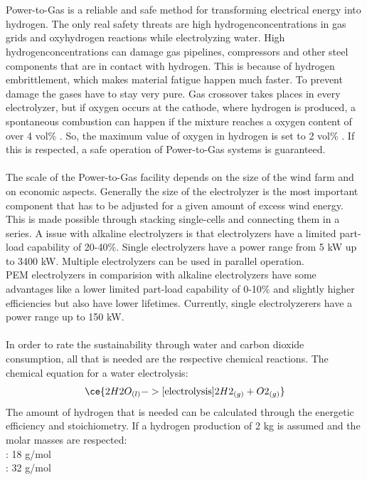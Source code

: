 \begin{parcolumns}[colwidths={1=2.5 cm, 2=10 cm, 3=2.5 cm}]{3}
{\\ \\
Power-to-Gas is a reliable and safe method for transforming electrical energy into hydrogen. The only real safety threats are high hydrogenconcentrations in gas grids and oxyhydrogen reactions while electrolyzing water. High hydrogenconcentrations can damage gas pipelines, compressors and other steel components that are in contact with hydrogen. This is because of hydrogen embrittlement, which makes material fatigue happen much faster. To prevent damage the gases have to stay very pure. Gas crossover takes places in every electrolyzer, but if oxygen occurs at the cathode, where hydrogen is produced, a spontaneous combustion can happen if the mixture reaches a oxygen content of over 4 vol\% . So, the maximum value of oxygen in hydrogen is set to 2 vol\% . If this is respected, a safe operation of Power-to-Gas systems is guaranteed.
\\ \\
The scale of the Power-to-Gas facility depends on the size of the wind farm and on economic aspects. Generally the size of the electrolyzer is the most important component that has to be adjusted for a given amount of excess wind energy. \\
This is made possible through stacking single-cells and connecting them in a series. A issue with alkaline electrolyzers is that electrolyzers have a limited part-load capability of 20-40\%. Single electrolyzers have a power range from 5 kW up to 3400 kW. Multiple electrolyzers can be used in parallel operation. 
\\
PEM electrolyzers in comparision with alkaline electrolyzers have some advantages like a lower limited part-load capability of 0-10\% and slightly higher efficiencies but also have lower lifetimes. Currently, single electrolyzerers have a power range up to 150 kW. 
\\ \\
In order to rate the sustainability through water and carbon dioxide consumption, all that is needed are the respective chemical reactions. The chemical equation for a water electrolysis: \\
\[\ce{2H2O_{(l)}  ->[\text{electrolysis}] 2H2_{(g)} + O2_{(g)}}\]
The amount of hydrogen that is needed can be calculated through the energetic efficiency and stoichiometry.
If a hydrogen production of 2 kg is assumed and the molar masses are respected: \\
 : 18 g/mol \\
 : 32 g/mol \\
}
\end{parcolumns}
